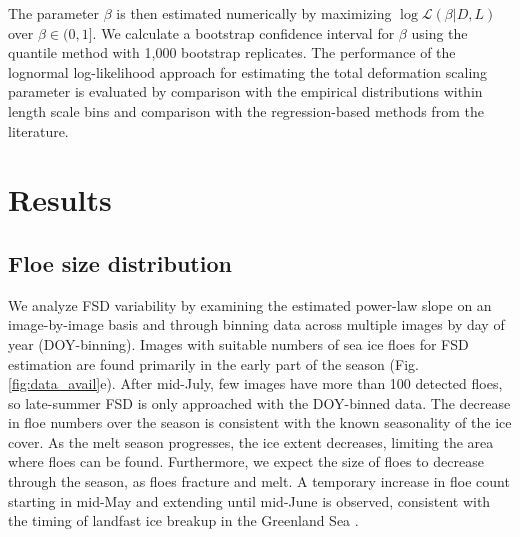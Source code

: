 \documentclass[aog]{igs}
\begin{document}
The parameter $\beta$ is then estimated numerically by maximizing $\log \mathcal{L}(\beta | D, L)$ over $\beta \in (0, 1]$. We calculate a bootstrap confidence interval for $\beta$ using the quantile method with 1,000 bootstrap replicates.  
The performance of the lognormal log-likelihood approach for estimating the total deformation scaling parameter is evaluated by comparison with the empirical distributions within length scale bins and comparison with the regression-based methods from the literature.


\section{Results}
\subsection{Floe size distribution}
We analyze FSD variability by examining the estimated power-law slope on an image-by-image basis and through binning data across multiple images by day of year (DOY-binning). 
Images with suitable numbers of sea ice floes for FSD estimation are found primarily in the early part of the season (Fig. \ref{fig:data_avail}e). 
After mid-July, few images have more than 100 detected floes, so late-summer FSD is only approached with the DOY-binned data.
The decrease in floe numbers over the season is consistent with the known seasonality of the ice cover. 
As the melt season progresses, the ice extent decreases, limiting the area where floes can be found. Furthermore, we expect the size of floes to decrease through the season, as floes fracture and melt. A temporary increase in floe count starting in mid-May and extending until mid-June is observed, consistent with the timing of landfast ice breakup in the Greenland Sea \citep{wadhams1981_IceCover, walsh2022_SeaIce}.
\end{document}
